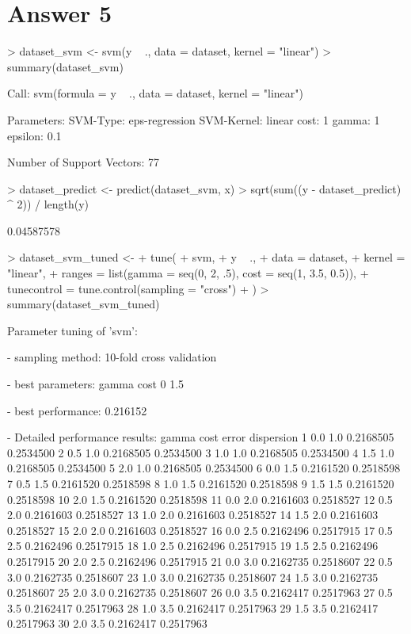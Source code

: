 \documentclass{article}
\begin{document}
\section*{Answer  5}

\begin{Schunk}
\begin{Sinput}
> dataset_svm <- svm(y ~ ., data = dataset, kernel = "linear")
> summary(dataset_svm)
\end{Sinput}
\begin{Soutput}
Call:
svm(formula = y ~ ., data = dataset, kernel = "linear")


Parameters:
   SVM-Type:  eps-regression 
 SVM-Kernel:  linear 
       cost:  1 
      gamma:  1 
    epsilon:  0.1 


Number of Support Vectors:  77
\end{Soutput}
\begin{Sinput}
> dataset_predict <- predict(dataset_svm, x)
> sqrt(sum((y - dataset_predict) ^ 2)) / length(y)
\end{Sinput}
\begin{Soutput}
[1] 0.04587578
\end{Soutput}
\begin{Sinput}
> dataset_svm_tuned <-
+   tune(
+     svm,
+     y ~ .,
+     data = dataset,
+     kernel = "linear",
+     ranges = list(gamma = seq(0, 2, .5), cost = seq(1, 3.5, 0.5)),
+     tunecontrol = tune.control(sampling = "cross")
+   )
> summary(dataset_svm_tuned)
\end{Sinput}
\begin{Soutput}
Parameter tuning of 'svm':

- sampling method: 10-fold cross validation 

- best parameters:
 gamma cost
     0  1.5

- best performance: 0.216152 

- Detailed performance results:
   gamma cost     error dispersion
1    0.0  1.0 0.2168505  0.2534500
2    0.5  1.0 0.2168505  0.2534500
3    1.0  1.0 0.2168505  0.2534500
4    1.5  1.0 0.2168505  0.2534500
5    2.0  1.0 0.2168505  0.2534500
6    0.0  1.5 0.2161520  0.2518598
7    0.5  1.5 0.2161520  0.2518598
8    1.0  1.5 0.2161520  0.2518598
9    1.5  1.5 0.2161520  0.2518598
10   2.0  1.5 0.2161520  0.2518598
11   0.0  2.0 0.2161603  0.2518527
12   0.5  2.0 0.2161603  0.2518527
13   1.0  2.0 0.2161603  0.2518527
14   1.5  2.0 0.2161603  0.2518527
15   2.0  2.0 0.2161603  0.2518527
16   0.0  2.5 0.2162496  0.2517915
17   0.5  2.5 0.2162496  0.2517915
18   1.0  2.5 0.2162496  0.2517915
19   1.5  2.5 0.2162496  0.2517915
20   2.0  2.5 0.2162496  0.2517915
21   0.0  3.0 0.2162735  0.2518607
22   0.5  3.0 0.2162735  0.2518607
23   1.0  3.0 0.2162735  0.2518607
24   1.5  3.0 0.2162735  0.2518607
25   2.0  3.0 0.2162735  0.2518607
26   0.0  3.5 0.2162417  0.2517963
27   0.5  3.5 0.2162417  0.2517963
28   1.0  3.5 0.2162417  0.2517963
29   1.5  3.5 0.2162417  0.2517963
30   2.0  3.5 0.2162417  0.2517963
\end{Soutput}
\end{Schunk}
\end{document}

